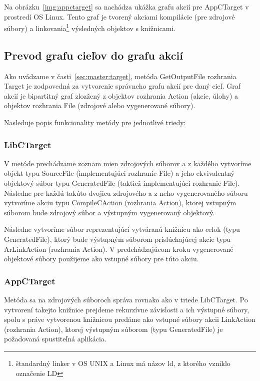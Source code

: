 Na obrázku~\ref{img:appctarget} sa nachádza ukážka grafu akcií pre AppCTarget
v prostredí OS Linux. Tento graf je tvorený akciami kompilácie (pre zdrojové
súbory) a linkovania\footnote{štandardný linker v OS UNIX a Linux má názov ld,
z ktorého vzniklo označenie LD} výsledných objektov s knižnicami.

\subsection{Prevod grafu cie\v{l}ov do grafu akci\'{i}}
\label{sec:master:target2action}

Ako uvádzame v časti~\ref{sec:master:target}, metóda GetOutputFile rozhrania Target
je zodpovedná za vytvorenie správneho grafu akcií pre daný cieľ. Graf akcií je
bipartitný graf zlozžený z objektov rozhrania Action (akcie, úlohy) a objektov
rozhrania File (zdrojové alebo vygenerované súbory).

Nasleduje popis funkcionality metódy pre jednotlivé triedy:

\subsubsection{LibCTarget}
V metóde prechádzame zoznam mien zdrojových súborov a z každého vytvoríme objekt typu
SourceFile (implementujúci rozhranie File) a jeho ekvivalentný objektový súbor
typu GeneratedFile (taktiež implementujúci rozhranie File). Následne pre každú
takúto dvojicu zdrojového a z neho vygenerovaného súboru vytvoríme akciu typu
CompileCAction (rozhrania Action), ktorej vstupným súborom bude zdrojový
súbor a výstupným vygenerovaný objektový.

Následne vytvoríme súbor reprezentujúci vytváranú knižnicu ako celok (typu GeneratedFile),
ktorý bude výstupným súborom prislúchajúcej akcie typu ArLinkAction (rozhrania Action).
V predchádzajúcom kroku vygenerované objektové súbory použijeme ako vstupné
súbory pre túto akciu.

\subsubsection{AppCTarget}
Metóda sa na zdrojových súboroch správa rovnako ako v triede LibCTarget. Po
vytvorení takejto knižnice prejdeme rekurzívne závislosti a ich výstupné
súbory, spolu s práve vytvorenou knižnicou predáme ako vstupné súbory
akcii LinkAction (rozhrania Action), ktorej výstupným súborom (typu GeneratedFile)
je požadovaná spustiteľná aplikácia.

